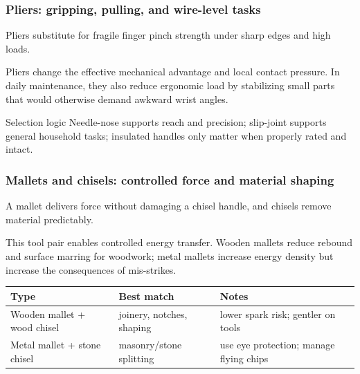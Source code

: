 \begin{frame}[t]
  \frametitle{Pliers: gripping, pulling, and wire-level tasks}
  \justifying
   Pliers substitute for fragile finger pinch strength under sharp edges and high loads.

  \vspace{0.5em}
   Pliers change the effective mechanical advantage and local contact pressure. In daily maintenance, they also reduce ergonomic load by stabilizing small parts that would otherwise demand awkward wrist angles.

  \vspace{0.8em}
  \begin{block}{Selection logic}
    Needle-nose supports reach and precision; slip-joint supports general household tasks; insulated handles only matter when properly rated and intact.
  \end{block}
\end{frame}

\begin{frame}[t]
  \frametitle{Mallets and chisels: controlled force and material shaping}
  \justifying
   A mallet delivers force without damaging a chisel handle, and chisels remove material predictably.

  \vspace{0.5em}
   This tool pair enables controlled energy transfer. Wooden mallets reduce rebound and surface marring for woodwork; metal mallets increase energy density but increase the consequences of mis-strikes.

  \vspace{0.8em}
  \TableBodySize
  \begin{table}
    \centering
    \begin{tabularx}{\textwidth}{@{}lX X@{}}
      \toprule
      \textbf{Type} & \textbf{Best match} & \textbf{Notes} \\
      \midrule
      Wooden mallet + wood chisel & joinery, notches, shaping & lower spark risk; gentler on tools \\
      Metal mallet + stone chisel & masonry/stone splitting & use eye protection; manage flying chips \\
      \bottomrule
    \end{tabularx}
  \end{table}
\end{frame}

